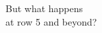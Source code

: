 \documentclass[preview]{standalone}
\begin{document}
\begin{center}
But what happens\\at row 5 and beyond?
\end{center}
\end{document}
